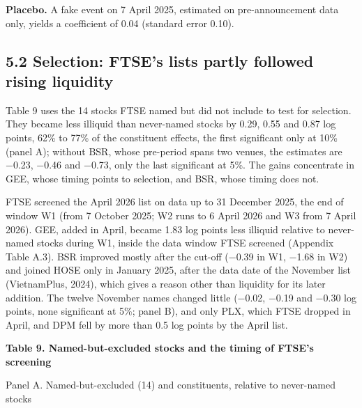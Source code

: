 \documentclass[review,authoryear,12pt]{elsarticle}
\begin{document}
\textbf{Placebo.} A fake event on 7 April 2025, estimated on
pre-announcement data only, yields a coefficient of 0.04 (standard error
0.10).

\hypertarget{selection-ftses-lists-partly-followed-rising-liquidity}{%
\subsection*{5.2 Selection: FTSE's lists partly followed rising
liquidity}}

Table 9 uses the 14 stocks FTSE named but did not include to test for
selection. They became less illiquid than never-named stocks by 0.29,
0.55 and 0.87 log points, 62\% to 77\% of the constituent effects, the
first significant only at 10\% (panel A); without BSR, whose pre-period
spans two venues, the estimates are −0.23, −0.46 and −0.73, only the
last significant at 5\%. The gains concentrate in GEE, whose timing
points to selection, and BSR, whose timing does not.

FTSE screened the April 2026 list on data up to 31 December 2025, the
end of window W1 (from 7 October 2025; W2 runs to 6 April 2026 and W3
from 7 April 2026). GEE, added in April, became 1.83 log points less
illiquid relative to never-named stocks during W1, inside the data
window FTSE screened (Appendix Table A.3). BSR improved mostly after the
cut-off (−0.39 in W1, −1.68 in W2) and joined HOSE only in January 2025,
after the data date of the November list (VietnamPlus, 2024), which
gives a reason other than liquidity for its later addition. The twelve
November names changed little (−0.02, −0.19 and −0.30 log points, none
significant at 5\%; panel B), and only PLX, which FTSE dropped in April,
and DPM fell by more than 0.5 log points by the April list.

\textbf{Table 9. Named-but-excluded stocks and the timing of FTSE's
screening}

Panel A. Named-but-excluded (14) and constituents, relative to
never-named stocks
\end{document}
